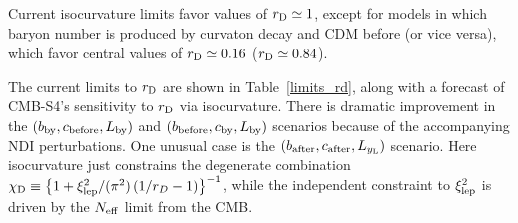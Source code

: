 Current isocurvature limits favor values of $r_{\rm D}\simeq 1$, except for models in which baryon number is produced by curvaton decay and CDM before (or vice versa), which favor central values of $r_{\rm D} \simeq 0.16$ ($r_{\rm D} \simeq 0.84$). 

The current limits \cite{Smith:2015bln} to $r_{\rm D}$ are shown in Table~\ref{limits_rd}, along with a forecast of CMB-S4's sensitivity to $r_{\rm D}$ via isocurvature. There is dramatic improvement in the $(b_{\rm by},c_{\rm before},L_{\rm by})$ and $(b_{\rm before},c_{\rm by},L_{\rm by})$ scenarios because of the accompanying NDI perturbations. One unusual case is the $(b_{\rm after},c_{\rm after}, L_{y_{\rm L}})$ scenario. Here isocurvature just constrains the degenerate combination \cite{Smith:2015bln} $\chi_{\rm D} \equiv \left\{1+\xi_{\rm lep}^2/(\pi^2) \left(1/r_D -1\right)\right\}^{-1}$, while the independent constraint to $\xi_{\rm lep}^{2}$ is driven by the $N_{\rm eff}$ limit from the CMB.

